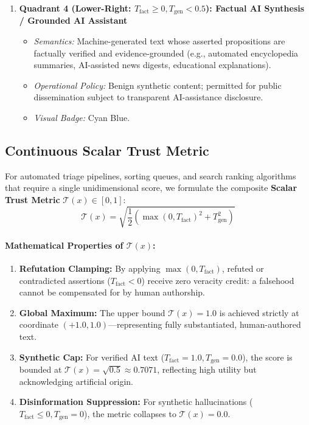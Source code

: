 \begin{enumerate}
    \item \textbf{Quadrant 4 (Lower-Right: $T_{\text{fact}} \ge 0, T_{\text{gen}} < 0.5$): Factual AI Synthesis / Grounded AI Assistant}
    \begin{itemize}
        \item \textit{Semantics:} Machine-generated text whose asserted propositions are factually verified and evidence-grounded (e.g., automated encyclopedia summaries, AI-assisted news digests, educational explanations).
        \item \textit{Operational Policy:} Benign synthetic content; permitted for public dissemination subject to transparent AI-assistance disclosure.
        \item \textit{Visual Badge:} Cyan Blue.
    \end{itemize}
\end{enumerate}

\subsection{Continuous Scalar Trust Metric}
For automated triage pipelines, sorting queues, and search ranking algorithms that require a single unidimensional score, we formulate the composite \textbf{Scalar Trust Metric} $\mathcal{T}(x) \in [0, 1]$:
\begin{equation}
    \label{eq:scalar_trust_metric}
    \mathcal{T}(x) = \sqrt{\frac{1}{2} \left(\max(0, T_{\text{fact}})^2 + T_{\text{gen}}^2\right)}
\end{equation}

\paragraph{Mathematical Properties of $\mathcal{T}(x)$:}
\begin{enumerate}
    \item \textbf{Refutation Clamping:} By applying $\max(0, T_{\text{fact}})$, refuted or contradicted assertions ($T_{\text{fact}} < 0$) receive zero veracity credit: a falsehood cannot be compensated for by human authorship.
    \item \textbf{Global Maximum:} The upper bound $\mathcal{T}(x) = 1.0$ is achieved strictly at coordinate $(+1.0, 1.0)$---representing fully substantiated, human-authored text.
    \item \textbf{Synthetic Cap:} For verified AI text ($T_{\text{fact}} = 1.0, T_{\text{gen}} = 0.0$), the score is bounded at $\mathcal{T}(x) = \sqrt{0.5} \approx 0.7071$, reflecting high utility but acknowledging artificial origin.
    \item \textbf{Disinformation Suppression:} For synthetic hallucinations ($T_{\text{fact}} \le 0, T_{\text{gen}} = 0$), the metric collapses to $\mathcal{T}(x) = 0.0$.
\end{enumerate}

